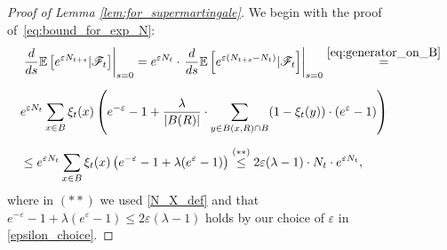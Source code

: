 \documentclass[a4paper,12pt]{article}
\begin{document}
\begin{proof}[Proof of Lemma \ref{lem:for_supermartingale}]
We begin with the proof of~\eqref{eq:bound_for_exp_N}:
\begin{align}
\nonumber&\left. \frac{d}{ds} \mathbb{E}\left[ e^{\varepsilon N_{t+s}}|\mathscr{F}_t \right] \right|_{s = 0} = e^{\varepsilon N_t} \cdot \left. \frac{d}{ds}\mathbb{E}\left[ e^{\varepsilon (N_{t+s}-N_t)}|\mathscr{F}_t\right] \right|_{s=0}  \stackrel{ \eqref{eq:generator_on_B} }{=} \\[.2cm]
\nonumber& e^{\varepsilon N_t}  \sum_{x \in B} \xi_t(x)\left( e^{-\varepsilon} - 1 + \frac{\lambda}{|B(R)|}\cdot\sum_{y \in B(x,R) \cap B} (1-\xi_t(y))\cdot (e^{\varepsilon}-1) \right)\\[.2cm]
\label{eq:aux_eq_error}&\leq  e^{\varepsilon N_t} \sum_{x \in B} \xi_t(x) \left( e^{-\varepsilon} - 1+\lambda (e^{\varepsilon}-1) \right)
\stackrel{(**)}{\leq} 2 \varepsilon (\lambda - 1)\cdot  N_t \cdot e^{\varepsilon N_t},
\end{align}
where in $(**)$ we used \eqref{N_X_def} and that $e^{-\varepsilon} - 1+\lambda (e^{\varepsilon}-1) \leq 2 \varepsilon (\lambda - 1)$ holds by our choice of $\varepsilon$
in \eqref{epsilon_choice}.


\end{proof}
\end{document}

